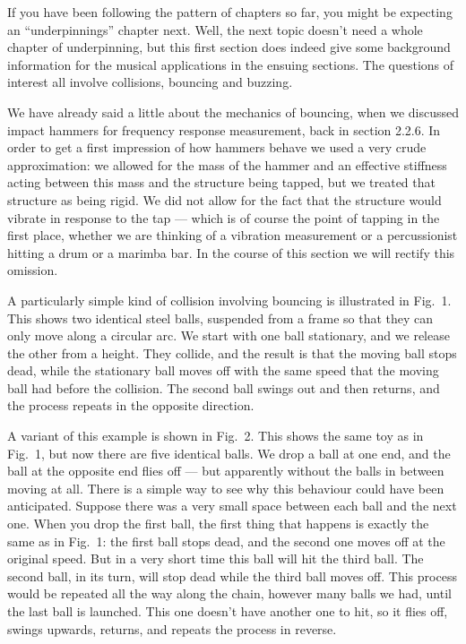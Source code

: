 
  If you have been following the pattern of chapters so far, you might be 
  expecting an “underpinnings” chapter next. Well, the next topic doesn’t need 
  a whole chapter of underpinning, but this first section does indeed give some 
  background information for the musical applications in the ensuing sections. 
  The questions of interest all involve collisions, bouncing and buzzing. 

  We have already said a little about the mechanics of bouncing, when we 
  discussed impact hammers for frequency response measurement, back in section 
  2.2.6. In order to get a first impression of how hammers behave we used a 
  very crude approximation: we allowed for the mass of the hammer and an 
  effective stiffness acting between this mass and the structure being tapped, 
  but we treated that structure as being rigid. We did not allow for the fact 
  that the structure would vibrate in response to the tap — which is of course 
  the point of tapping in the first place, whether we are thinking of a 
  vibration measurement or a percussionist hitting a drum or a marimba bar. In 
  the course of this section we will rectify this omission. 

  A particularly simple kind of collision involving bouncing is illustrated in 
  Fig.\ 1. This shows two identical steel balls, suspended from a frame so that 
  they can only move along a circular arc. We start with one ball stationary, 
  and we release the other from a height. They collide, and the result is that 
  the moving ball stops dead, while the stationary ball moves off with the same 
  speed that the moving ball had before the collision. The second ball swings 
  out and then returns, and the process repeats in the opposite direction. 

  A variant of this example is shown in Fig.\ 2. This shows the same toy as in 
  Fig.\ 1, but now there are five identical balls. We drop a ball at one end, 
  and the ball at the opposite end flies off — but apparently without the balls 
  in between moving at all. There is a simple way to see why this behaviour 
  could have been anticipated. Suppose there was a very small space between 
  each ball and the next one. When you drop the first ball, the first thing 
  that happens is exactly the same as in Fig.\ 1: the first ball stops dead, 
  and the second one moves off at the original speed. But in a very short time 
  this ball will hit the third ball. The second ball, in its turn, will stop 
  dead while the third ball moves off. This process would be repeated all the 
  way along the chain, however many balls we had, until the last ball is 
  launched. This one doesn’t have another one to hit, so it flies off, swings 
  upwards, returns, and repeats the process in reverse. 

